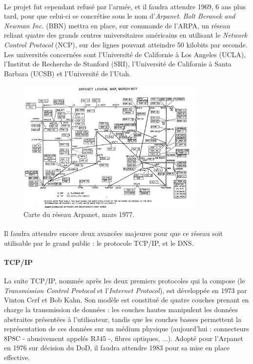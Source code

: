 \paragraph{} Le projet fut cependant refusé par l'armée, et il faudra attendre 1969, 6 ans plus tard, pour que celui-ci
se concrétise sous le nom d'\emph{Arpanet}. \emph{Bolt Beranek and Newman Inc.} (BBN) mettra en place, sur commande de
l'ARPA, un réseau reliant quatre des grands centres universitaires américains en utilisant le \emph{Network Control Protocol}
(NCP), sur des lignes pouvant atteindre 50 kilobits par seconde. Les universités concernées sont l'Université de Californie
à Los Angeles (UCLA), l'Institut de Recherche de Stanford (SRI), l'Université de Californie à Santa Barbara (UCSB) et
l'Université de l'Utah.

\begin{figure}[ht]
    \centering
    \includegraphics[width=350px]{chapters/01/images/arpanet_map.jpg}
    \caption{\label{arpanet}Carte du réseau Arpanet, mars 1977.}
\end{figure}

\paragraph{} Il faudra attendre encore deux avancées majeures pour que ce réseau soit utilisable par le grand public :
le protocole TCP/IP, et le DNS.

\paragraph{TCP/IP} La suite TCP/IP, nommée après les deux premiers protocoles qui la compose (le \emph{Transmission Control
Protocol} et l'\emph{Internet Protocol}), est développée en 1973 par Vinton Cerf et Bob Kahn. Son modèle est constitué de
quatre couches prenant en charge la transmission de données : les couches hautes manipulent les données abstraites
présentées à l'utilisateur, tandis que les couches basses permettent la représentation de ces données sur un médium
physique (aujourd'hui : connecteurs 8P8C - abusivement appelés RJ45 -, fibres optiques, ...). Adopté pour l'Arpanet en
1976 sur décision du DoD, il faudra attendre 1983 pour sa mise en place effective.

